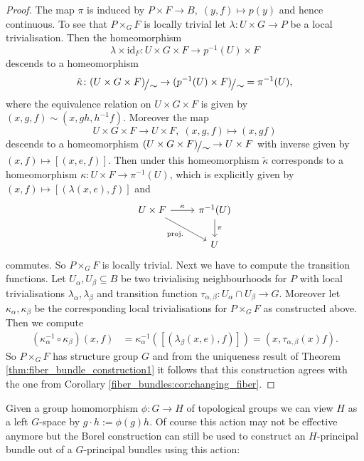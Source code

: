 \begin{proof}
    The map $\pi$ is induced by $P \times F \to B, \; (y,f) \mapsto p(y)$ and hence continuous. To see that $P \times_G F$ is locally trivial let $\lambda \colon U \times G \to P$ be a local trivialisation. Then the homeomorphism 
    \[
    \lambda \times \mathrm{id}_F \colon U \times G \times F \to p^{-1}(U) \times F
    \]
    descends to a homeomorphism
    \[
    \tilde{\kappa} \colon \modulo{(U \times G \times F)}{\sim} \to \modulo{(p^{-1}(U) \times F)}{\sim} = \pi^{-1}(U),
    \]
    where the equivalence relation on $U \times G \times F$ is given by $(x,g,f) \sim (x,gh,h^{-1}f)$. Moreover the map 
    \[
    U \times G \times F \to U \times F, \; (x,g,f) \mapsto (x,gf)
    \]
    descends to a homeomorphism $\modulo{(U \times G \times F)}{\sim} \to U \times F$ with inverse given by $(x,f) \mapsto [(x,e,f)]$. Then under this homeomorphism $\tilde{\kappa}$ corresponds to a homeomorphism $\kappa \colon U \times F \to \pi^{-1}(U)$, which is explicitly given by $(x,f) \mapsto [(\lambda(x,e),f)]$ and
    \[\begin{tikzcd}
	{U \times F} & {\pi^{-1}(U)} \\
	{} & U
	\arrow["{\kappa}", from=1-1, to=1-2]
	\arrow["{\mathrm{proj.}}"', from=1-1, to=2-2]
    \arrow["\pi", from=1-2, to=2-2]
    \end{tikzcd}\]
    commutes. So $P \times_G F$ is locally trivial. Next we have to compute the transition functions. Let $U_\alpha, U_\beta \subseteq B$ be two trivialising neighbourhoods for $P$ with  local trivialisations $\lambda_\alpha, \lambda_\beta$ and transition function $\tau_{\alpha,\beta} \colon U_\alpha \cap U_\beta \to G$. Moreover let $\kappa_\alpha, \kappa_\beta$ be the corresponding local trivialisations for $P \times_G F$ as constructed above. Then we compute 
    \begin{align*}
        (\kappa_\alpha^{-1} \circ \kappa_\beta)(x,f) & = \kappa_\alpha^{-1}([(\lambda_\beta(x,e),f)]) = (x,\tau_{\alpha,\beta}(x) f).
    \end{align*}
    So $P \times_G F$ has structure group $G$ and from the uniqueness result of Theorem \ref{thm:fiber_bundle_construction1} it follows that this construction agrees with the one from Corollary \ref{fiber_bundles:cor:changing_fiber}.
\end{proof}

Given a group homomorphism $\phi \colon G \to H$ of topological groups we can view $H$ as a left $G$-space by $g \cdot h := \phi(g)h$. Of course this action may not be effective anymore but the Borel construction can still be used to construct an $H$-principal bundle out of a $G$-principal bundles using this action:

